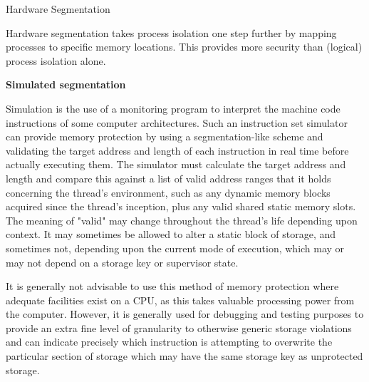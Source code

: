 \documentclass[12pt]{article}
\begin{document}
\begin{adjustwidth}{0.25in}{0.0in}
{\fontsize{18pt}{21.6pt}\selectfont Hardware Segmentation\par}\par

\end{adjustwidth}

\begin{adjustwidth}{0.25in}{0.0in}
{\fontsize{16pt}{19.2pt}\selectfont Hardware segmentation takes process isolation one step further by mapping processes to specific memory locations. This provides more security than (logical) process isolation alone.\par}\par

\end{adjustwidth}

\begin{adjustwidth}{0.25in}{0.0in}
{\fontsize{18pt}{21.6pt}\selectfont \textbf{Simulated segmentation}\par}\par

\end{adjustwidth}

\begin{adjustwidth}{0.25in}{0.0in}
{\fontsize{16pt}{19.2pt}\selectfont Simulation is the use of a monitoring program to interpret the machine code instructions of some computer architectures. Such an instruction set simulator can provide memory protection by using a segmentation-like scheme and validating the target address and length of each instruction in real time before actually executing them. The simulator must calculate the target address and length and compare this against a list of valid address ranges that it holds concerning the thread's environment, such as any dynamic memory blocks acquired since the thread's inception, plus any valid shared static memory slots. The meaning of "valid" may change throughout the thread's life depending upon context. It may sometimes be allowed to alter a static block of storage, and sometimes not, depending upon the current mode of execution, which may or may not depend on a storage key or supervisor state.\par}\par

\end{adjustwidth}

\begin{adjustwidth}{0.25in}{0.0in}
{\fontsize{16pt}{19.2pt}\selectfont It is generally not advisable to use this method of memory protection where adequate facilities exist on a CPU, as this takes valuable processing power from the computer. However, it is generally used for debugging and testing purposes to provide an extra fine level of granularity to otherwise generic storage violations and can indicate precisely which instruction is attempting to overwrite the particular section of storage which may have the same storage key as unprotected storage.\par}\par

\end{adjustwidth}
\end{document}
